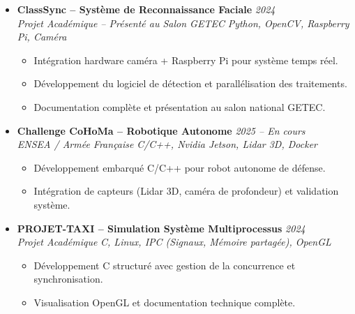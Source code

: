 \documentclass[a4paper,11pt]{article}
\begin{document}
\begin{itemize}[leftmargin=*, label={-}]
\item \textbf{ClassSync -- Système de Reconnaissance Faciale} \hfill \textit{2024} \\
\textit{Projet Académique -- Présenté au Salon GETEC} \hfill \textit{Python, OpenCV, Raspberry Pi, Caméra}
\vspace{-2pt}
    \begin{itemize}[leftmargin=0.4cm, nosep, label=\tiny$\bullet$]
        \item \small{Intégration hardware caméra + Raspberry Pi pour système temps réel.}
        \item \small{Développement du logiciel de détection et parallélisation des traitements.}
        \item \small{Documentation complète et présentation au salon national GETEC.}
    \end{itemize}
\vspace{3pt}

\item \textbf{Challenge CoHoMa -- Robotique Autonome} \hfill \textit{2025 -- En cours} \\
\textit{ENSEA / Armée Française} \hfill \textit{C/C++, Nvidia Jetson, Lidar 3D, Docker}
\vspace{-2pt}
    \begin{itemize}[leftmargin=0.4cm, nosep, label=\tiny$\bullet$]
        \item \small{Développement embarqué C/C++ pour robot autonome de défense.}
        \item \small{Intégration de capteurs (Lidar 3D, caméra de profondeur) et validation système.}
    \end{itemize}
\vspace{3pt}

\item \textbf{PROJET-TAXI -- Simulation Système Multiprocessus} \hfill \textit{2024} \\
\textit{Projet Académique} \hfill \textit{C, Linux, IPC (Signaux, Mémoire partagée), OpenGL}
\vspace{-2pt}
    \begin{itemize}[leftmargin=0.4cm, nosep, label=\tiny$\bullet$]
        \item \small{Développement C structuré avec gestion de la concurrence et synchronisation.}
        \item \small{Visualisation OpenGL et documentation technique complète.}
    \end{itemize}
\vspace{3pt}


\end{itemize}
\end{document}
